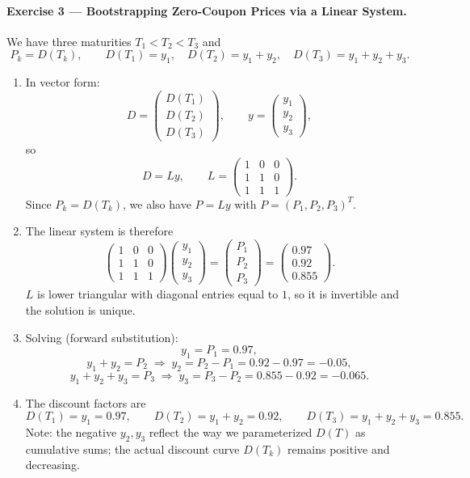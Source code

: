 \documentclass[11pt]{article}
\begin{document}
\paragraph{Exercise 3 — Bootstrapping Zero-Coupon Prices via a Linear System.}

We have three maturities $T_1<T_2<T_3$ and
\[
P_k = D(T_k),\qquad
D(T_1)=y_1,\quad D(T_2)=y_1+y_2,\quad D(T_3)=y_1+y_2+y_3.
\]

\begin{enumerate}
\item[(1)] In vector form:
\[
D=
\begin{pmatrix}
D(T_1)\\D(T_2)\\D(T_3)
\end{pmatrix},
\qquad
y=
\begin{pmatrix}
y_1\\y_2\\y_3
\end{pmatrix},
\]
so
\[
D = Ly,\qquad
L =
\begin{pmatrix}
1 & 0 & 0\\
1 & 1 & 0\\
1 & 1 & 1
\end{pmatrix}.
\]
Since $P_k=D(T_k)$, we also have $P=Ly$ with $P=(P_1,P_2,P_3)^T$.

\item[(2)] The linear system is therefore
\[
\begin{pmatrix}
1 & 0 & 0\\
1 & 1 & 0\\
1 & 1 & 1
\end{pmatrix}
\begin{pmatrix}
y_1\\y_2\\y_3
\end{pmatrix}
=
\begin{pmatrix}
P_1\\P_2\\P_3
\end{pmatrix}
=
\begin{pmatrix}
0.97\\0.92\\0.855
\end{pmatrix}.
\]
$L$ is lower triangular with diagonal entries equal to $1$, so it is invertible and the solution is unique.

\item[(3)] Solving (forward substitution):
\[
y_1 = P_1 = 0.97,
\]
\[
y_1 + y_2 = P_2 \;\Rightarrow\; y_2 = P_2 - P_1 = 0.92 - 0.97 = -0.05,
\]
\[
y_1 + y_2 + y_3 = P_3 \;\Rightarrow\; y_3 = P_3 - P_2 = 0.855 - 0.92 = -0.065.
\]

\item[(4)] The discount factors are
\[
D(T_1)=y_1=0.97,\qquad
D(T_2)=y_1+y_2=0.92,\qquad
D(T_3)=y_1+y_2+y_3=0.855.
\]
Note: the negative $y_2,y_3$ reflect the way we parameterized $D(T)$ as cumulative sums; the actual discount curve $D(T_k)$ remains positive and decreasing.
\end{enumerate}
\end{document}
